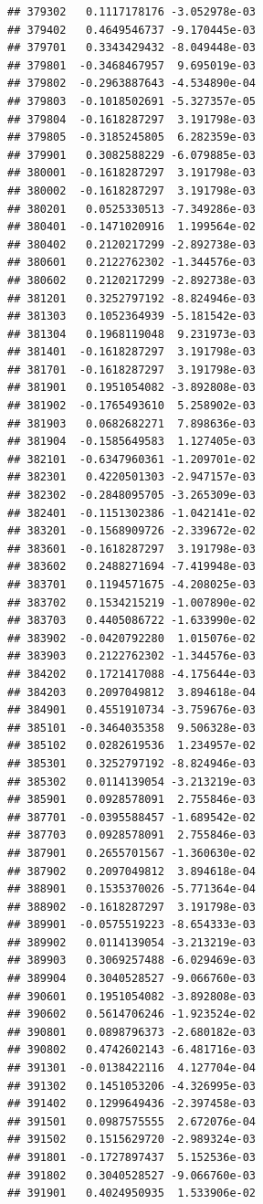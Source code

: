 \begin{frame}[fragile]
\begin{verbatim}
## 379302   0.1117178176 -3.052978e-03
## 379402   0.4649546737 -9.170445e-03
## 379701   0.3343429432 -8.049448e-03
## 379801  -0.3468467957  9.695019e-03
## 379802  -0.2963887643 -4.534890e-04
## 379803  -0.1018502691 -5.327357e-05
## 379804  -0.1618287297  3.191798e-03
## 379805  -0.3185245805  6.282359e-03
## 379901   0.3082588229 -6.079885e-03
## 380001  -0.1618287297  3.191798e-03
## 380002  -0.1618287297  3.191798e-03
## 380201   0.0525330513 -7.349286e-03
## 380401  -0.1471020916  1.199564e-02
## 380402   0.2120217299 -2.892738e-03
## 380601   0.2122762302 -1.344576e-03
## 380602   0.2120217299 -2.892738e-03
## 381201   0.3252797192 -8.824946e-03
## 381303   0.1052364939 -5.181542e-03
## 381304   0.1968119048  9.231973e-03
## 381401  -0.1618287297  3.191798e-03
## 381701  -0.1618287297  3.191798e-03
## 381901   0.1951054082 -3.892808e-03
## 381902  -0.1765493610  5.258902e-03
## 381903   0.0682682271  7.898636e-03
## 381904  -0.1585649583  1.127405e-03
## 382101  -0.6347960361 -1.209701e-02
## 382301   0.4220501303 -2.947157e-03
## 382302  -0.2848095705 -3.265309e-03
## 382401  -0.1151302386 -1.042141e-02
## 383201  -0.1568909726 -2.339672e-02
## 383601  -0.1618287297  3.191798e-03
## 383602   0.2488271694 -7.419948e-03
## 383701   0.1194571675 -4.208025e-03
## 383702   0.1534215219 -1.007890e-02
## 383703   0.4405086722 -1.633990e-02
## 383902  -0.0420792280  1.015076e-02
## 383903   0.2122762302 -1.344576e-03
## 384202   0.1721417088 -4.175644e-03
## 384203   0.2097049812  3.894618e-04
## 384901   0.4551910734 -3.759676e-03
## 385101  -0.3464035358  9.506328e-03
## 385102   0.0282619536  1.234957e-02
## 385301   0.3252797192 -8.824946e-03
## 385302   0.0114139054 -3.213219e-03
## 385901   0.0928578091  2.755846e-03
## 387701  -0.0395588457 -1.689542e-02
## 387703   0.0928578091  2.755846e-03
## 387901   0.2655701567 -1.360630e-02
## 387902   0.2097049812  3.894618e-04
## 388901   0.1535370026 -5.771364e-04
## 388902  -0.1618287297  3.191798e-03
## 389901  -0.0575519223 -8.654333e-03
## 389902   0.0114139054 -3.213219e-03
## 389903   0.3069257488 -6.029469e-03
## 389904   0.3040528527 -9.066760e-03
## 390601   0.1951054082 -3.892808e-03
## 390602   0.5614706246 -1.923524e-02
## 390801   0.0898796373 -2.680182e-03
## 390802   0.4742602143 -6.481716e-03
## 391301  -0.0138422116  4.127704e-04
## 391302   0.1451053206 -4.326995e-03
## 391402   0.1299649436 -2.397458e-03
## 391501   0.0987575555  2.672076e-04
## 391502   0.1515629720 -2.989324e-03
## 391801  -0.1727897437  5.152536e-03
## 391802   0.3040528527 -9.066760e-03
## 391901   0.4024950935  1.533906e-02

\end{verbatim}
\end{frame}
